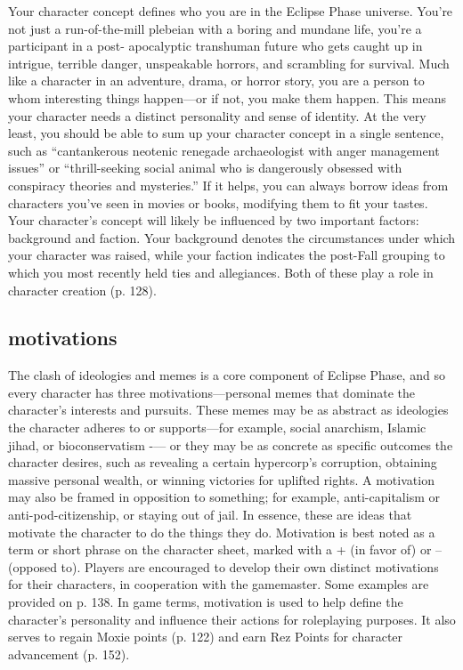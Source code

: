 Your character concept defines who you are in the Eclipse Phase universe. You're not just a run-of-the-mill plebeian with a boring and mundane life, you're a participant in a post- apocalyptic transhuman future who gets caught up in intrigue, terrible danger, unspeakable horrors, and scrambling for survival. Much like a character in an adventure, drama, or horror story, you are a person to whom interesting things happen—or if not, you make them happen. This means your character needs a distinct personality and sense of identity. At the very least, you should be able to sum up your character concept in a single sentence, such as “cantankerous neotenic renegade archaeologist with anger management issues” or “thrill-seeking social animal who is dangerously obsessed with conspiracy theories and mysteries.” If it helps, you can always borrow ideas from characters you've seen in movies or books, modifying them to fit your tastes. Your character's concept will likely be influenced by two important factors: background and faction. Your background denotes the circumstances under which your character was raised, while your faction indicates the post-Fall grouping to which you most recently held ties and allegiances. Both of these play a role in character creation (p. 128). 

\subsection{motivations} \label{sec:motivations} 

The clash of ideologies and memes is a core component of Eclipse Phase, and so every character has three motivations—personal memes that dominate the character's interests and pursuits. These memes may be as abstract as ideologies the character adheres to or supports—for example, social anarchism, Islamic jihad, or bioconservatism -— or they may be as concrete as specific outcomes the character desires, such as revealing a certain hypercorp's corruption, obtaining massive personal wealth, or winning victories for uplifted rights. A motivation may also be framed in opposition to something; for example, anti-capitalism or anti-pod-citizenship, or staying out of jail. In essence, these are ideas that motivate the character to do the things they do. Motivation is best noted as a term or short phrase on the character sheet, marked with a + (in favor of) or – (opposed to). Players are encouraged to develop their own distinct motivations for their characters, in cooperation with the gamemaster. Some examples are provided on p. 138. In game terms, motivation is used to help define the character's personality and influence their actions for roleplaying purposes. It also serves to regain Moxie points (p. 122) and earn Rez Points for character advancement (p. 152). 

